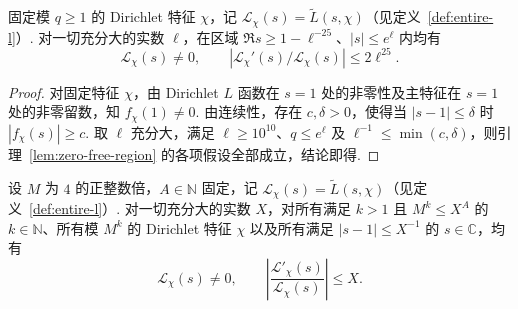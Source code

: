 \begin{lemma}[固定特征的无零点区域]
\label{lem:fixed-character-zero-free-region}
\emitthmsource
固定模 $q\ge1$ 的 Dirichlet 特征 $\chi$，记 $\mathcal L_\chi(s)=\widetilde L(s,\chi)$（见定义~\ref{def:entire-l}）. 对一切充分大的实数 $\ell$，在区域
$\Re s\ge1-\ell^{-25}$、$|s|\le e^\ell$ 内均有
\[
 \mathcal L_\chi(s)\ne0,\qquad
 |\mathcal L_\chi'(s)/\mathcal L_\chi(s)|\le2\ell^{25}.
\]
\end{lemma}

\begin{proof}
对固定特征 $\chi$，由 Dirichlet $L$ 函数在 $s=1$ 处的非零性及主特征在 $s=1$ 处的非零留数，知 $f_\chi(1)\ne0$. 由连续性，存在 $c,\delta>0$，使得当 $|s-1|\le\delta$ 时 $|f_\chi(s)|\ge c$. 取 $\ell$ 充分大，满足 $\ell\ge10^{10}$、$q\le e^\ell$ 及 $\ell^{-1}\le\min(c,\delta)$，则引理~\ref{lem:zero-free-region} 的各项假设全部成立，结论即得.
\end{proof}

\begin{lemma}
\label{lem:prime-window-disc}
\emitthmsource
设 $M$ 为 $4$ 的正整数倍，$A\in\mathbb N$ 固定，记 $\mathcal L_\chi(s)=\widetilde L(s,\chi)$（见定义~\ref{def:entire-l}）. 对一切充分大的实数 $X$，对所有满足 $k>1$ 且 $M^k\le X^A$ 的 $k\in\mathbb N$、所有模 $M^k$ 的 Dirichlet 特征 $\chi$ 以及所有满足 $|s-1|\le X^{-1}$ 的 $s\in\mathbb C$，均有
\[
 \mathcal L_\chi(s)\ne0,\qquad
 \left|\frac{\mathcal L'_\chi(s)}{\mathcal L_\chi(s)}\right|\le X .
\]
\end{lemma}

